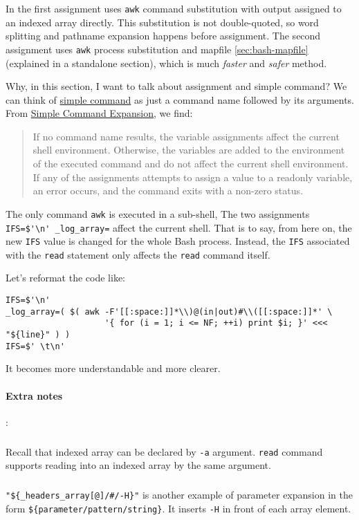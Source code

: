 In the first assignment uses \lstinline|awk| command substitution
with output assigned to an indexed array directly. This
substitution is not double-quoted, so word splitting and pathname
expansion happens before assignment. The second assignment uses
\lstinline|awk| process substitution and mapfile
\ref{sec:bash-mapfile} (explained in a standalone section), which
is much \textit{faster} and \textit{safer} method.

Why, in this section, I want to talk about assignment and simple
command? We can think of
\href{https://www.gnu.org/software/bash/manual/bash.html#Simple-Commands}{simple
  command} as just a command name followed by its arguments. From
\href{https://www.gnu.org/software/bash/manual/bash.html#Simple-Command-Expansion}{Simple
  Command Expansion}, we find:

\begin{quotation}
  If no command name results, the variable assignments affect the
  current shell environment. Otherwise, the variables are added to
  the environment of the executed command and do not affect the
  current shell environment. If any of the assignments attempts to
  assign a value to a readonly variable, an error occurs, and the
  command exits with a non-zero status.
\end{quotation}

The only command \lstinline|awk| is executed in a sub-shell, The
two assignments
\lstinline|IFS=$'\n' _log_array=| affect the current shell. That
is to say, from here on, the new \lstinline|IFS| value is changed
for the whole Bash process. Instead, the \lstinline|IFS|
associated with the \lstinline|read| statement only affects the
\lstinline|read| command itself.

Let's reformat the code like:

\begin{lstlisting}[basicstyle=\tiny\ttfamily]
IFS=$'\n'
_log_array=( $( awk -F'[[:space:]]*\\)@(in|out)#\\([[:space:]]*' \
                    '{ for (i = 1; i <= NF; ++i) print $i; }' <<< "${line}" ) )
IFS=$' \t\n'
\end{lstlisting}

It becomes more understandable and more clearer.

\paragraph{Extra notes}: \subparagraph{} Recall that indexed array
can be declared by \lstinline|-a| argument. \lstinline|read|
command supports reading into an indexed array by the same
argument.  \subparagraph{}
\lstinline|"${_headers_array[@]/#/-H}"| is another example of
parameter expansion in the form
\lstinline|${parameter/pattern/string}|. It inserts \lstinline|-H|
in front of each array element.

